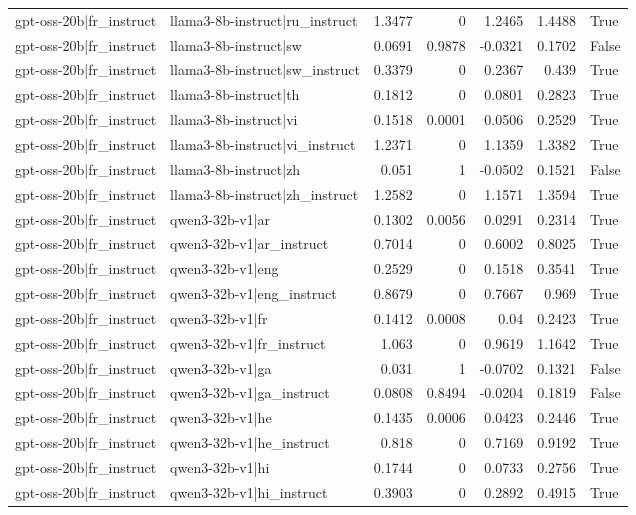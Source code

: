 \begin{table}
\begin{tabular}{l l r r r r l}
gpt-oss-20b|fr_instruct & llama3-8b-instruct|ru_instruct & 1.3477 & 0 & 1.2465 & 1.4488 & True \\
gpt-oss-20b|fr_instruct & llama3-8b-instruct|sw & 0.0691 & 0.9878 & -0.0321 & 0.1702 & False \\
gpt-oss-20b|fr_instruct & llama3-8b-instruct|sw_instruct & 0.3379 & 0 & 0.2367 & 0.439 & True \\
gpt-oss-20b|fr_instruct & llama3-8b-instruct|th & 0.1812 & 0 & 0.0801 & 0.2823 & True \\
gpt-oss-20b|fr_instruct & llama3-8b-instruct|vi & 0.1518 & 0.0001 & 0.0506 & 0.2529 & True \\
gpt-oss-20b|fr_instruct & llama3-8b-instruct|vi_instruct & 1.2371 & 0 & 1.1359 & 1.3382 & True \\
gpt-oss-20b|fr_instruct & llama3-8b-instruct|zh & 0.051 & 1 & -0.0502 & 0.1521 & False \\
gpt-oss-20b|fr_instruct & llama3-8b-instruct|zh_instruct & 1.2582 & 0 & 1.1571 & 1.3594 & True \\
gpt-oss-20b|fr_instruct & qwen3-32b-v1|ar & 0.1302 & 0.0056 & 0.0291 & 0.2314 & True \\
gpt-oss-20b|fr_instruct & qwen3-32b-v1|ar_instruct & 0.7014 & 0 & 0.6002 & 0.8025 & True \\
gpt-oss-20b|fr_instruct & qwen3-32b-v1|eng & 0.2529 & 0 & 0.1518 & 0.3541 & True \\
gpt-oss-20b|fr_instruct & qwen3-32b-v1|eng_instruct & 0.8679 & 0 & 0.7667 & 0.969 & True \\
gpt-oss-20b|fr_instruct & qwen3-32b-v1|fr & 0.1412 & 0.0008 & 0.04 & 0.2423 & True \\
gpt-oss-20b|fr_instruct & qwen3-32b-v1|fr_instruct & 1.063 & 0 & 0.9619 & 1.1642 & True \\
gpt-oss-20b|fr_instruct & qwen3-32b-v1|ga & 0.031 & 1 & -0.0702 & 0.1321 & False \\
gpt-oss-20b|fr_instruct & qwen3-32b-v1|ga_instruct & 0.0808 & 0.8494 & -0.0204 & 0.1819 & False \\
gpt-oss-20b|fr_instruct & qwen3-32b-v1|he & 0.1435 & 0.0006 & 0.0423 & 0.2446 & True \\
gpt-oss-20b|fr_instruct & qwen3-32b-v1|he_instruct & 0.818 & 0 & 0.7169 & 0.9192 & True \\
gpt-oss-20b|fr_instruct & qwen3-32b-v1|hi & 0.1744 & 0 & 0.0733 & 0.2756 & True \\
gpt-oss-20b|fr_instruct & qwen3-32b-v1|hi_instruct & 0.3903 & 0 & 0.2892 & 0.4915 & True \\

\end{tabular}
\end{table}
